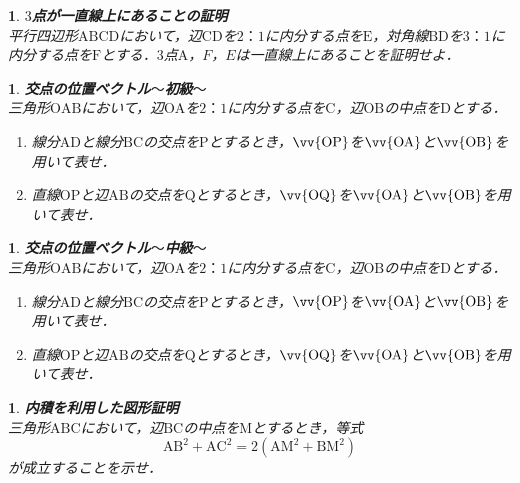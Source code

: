 \documentclass[10pt,
fleqn,
dvipdfmx,
uplatex
]{jsarticle}
\newtheorem{question}[Question]{}
\begin{document}
\begin{question}{\bf\boldmath $3$点が一直線上にあることの証明}\\
平行四辺形$\text{ABCD}$において，辺$\text{CD}$を$2：1$に内分する点を$\text{E}$，対角線$\text{BD}$を$3：1$に内分する点を$\text{F}$とする．$3$点$\text{A}$，$F$，$E$は一直線上にあることを証明せよ．
\end{question}



\begin{question}{\bf\boldmath 交点の位置ベクトル$〜$初級$〜$}\\
三角形$\text{OAB}$において，辺$\text{OA}$を$2：1$に内分する点を$\text{C}$，辺$\text{OB}$の中点を$\text{D}$とする．
\begin{enumerate}
\item 線分$\text{AD}$と線分$\text{BC}$の交点を$\text{P}$とするとき，$\vv{\text{OP}}$を$\vv{\text{OA}}$と$\vv{\text{OB}}$を用いて表せ．
\item 直線$\text{OP}$と辺$\text{AB}$の交点を$\text{Q}$とするとき，$\vv{\text{OQ}}$を$\vv{\text{OA}}$と$\vv{\text{OB}}$を用いて表せ．
\end{enumerate}

\end{question}



\begin{question}{\bf\boldmath 交点の位置ベクトル$〜$中級$〜$}\\
三角形$\text{OAB}$において，辺$\text{OA}$を$2：1$に内分する点を$\text{C}$，辺$\text{OB}$の中点を$\text{D}$とする．
\begin{enumerate}
\item 線分$\text{AD}$と線分$\text{BC}$の交点を$\text{P}$とするとき，$\vv{\text{OP}}$を$\vv{\text{OA}}$と$\vv{\text{OB}}$を用いて表せ．
\item 直線$\text{OP}$と辺$\text{AB}$の交点を$\text{Q}$とするとき，$\vv{\text{OQ}}$を$\vv{\text{OA}}$と$\vv{\text{OB}}$を用いて表せ．
\end{enumerate}

\end{question}



\begin{question}{\bf\boldmath 内積を利用した図形証明}\\
三角形$\text{ABC}$において，辺$\text{BC}$の中点を$\text{M}$とするとき，等式
\[\text{AB}^2+\text{AC}^2=2\left(\text{AM}^2+\text{BM}^2\right)\]
が成立することを示せ．
\end{question}
\end{document}

